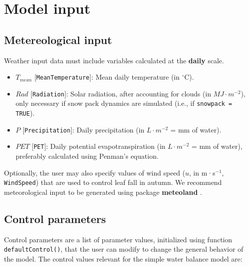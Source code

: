 \documentclass[]{book}
\providecommand{\tightlist}{%
  \setlength{\itemsep}{0pt}\setlength{\parskip}{0pt}}
\begin{document}
\hypertarget{model-input}{%
\section{Model input}\label{model-input}}

\hypertarget{metereological-input}{%
\subsection{Metereological input}\label{metereological-input}}

Weather input data must include variables calculated at the \textbf{daily} scale.

\begin{itemize}
\tightlist
\item
  \(T_{mean}\) {[}\texttt{MeanTemperature}{]}: Mean daily temperature (in \(^{\circ} \mathrm{C}\)).
\item
  \(Rad\) {[}\texttt{Radiation}{]}: Solar radiation, after accounting for clouds (in \(MJ \cdot m^{-2}\)), only necessary if snow pack dynamics are simulated (i.e., if \texttt{snowpack = TRUE}).
\item
  \(P\) {[}\texttt{Precipitation}{]}: Daily precipitation (in \(L \cdot m^{-2}\) = mm of water).
\item
  \(PET\) {[}\texttt{PET}{]}: Daily potential evapotranspiration (in \(L \cdot m^{-2}\) = mm of water), preferably calculated using Penman's equation.
\end{itemize}

Optionally, the user may also specify values of wind speed (\(u\), in m·s\(^{-1}\), \texttt{WindSpeed}) that are used to control leaf fall in autumn. We recommend meteorological input to be generated using package \textbf{meteoland} \citep{DeCaceres2018}.

\hypertarget{control-parameters}{%
\subsection{Control parameters}\label{control-parameters}}

Control parameters are a list of parameter values, initialized using function \texttt{defaultControl()}, that the user can modify to change the general behavior of the model. The control values relevant for the simple water balance model are:
\end{document}
